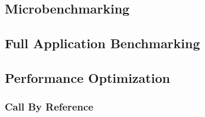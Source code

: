 \subsection{Microbenchmarking}
\subsection{Full Application Benchmarking}
\subsection{Performance Optimization}
\subsubsection{Call By Reference}
